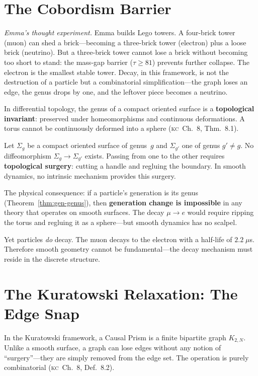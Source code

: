 \documentclass[11pt, a4paper, openany]{book}
\newcommand{\KC}[1]{\textnormal{(\textsc{kc}~#1)}}
\newcounter{thm}[chapter]
\begin{document}
\section{The Cobordism Barrier}\label{sec:cobordism}

\smallskip\noindent
\textit{Emma's thought experiment.}
Emma builds Lego towers. A four-brick tower (muon) can shed a
brick---becoming a three-brick tower (electron) plus a loose brick
(neutrino). But a three-brick tower cannot lose a brick without becoming
too short to stand: the mass-gap barrier ($\tau \geq 81$) prevents
further collapse.  The electron is the smallest stable tower. Decay, in this framework, is not
the destruction of a particle but a combinatorial simplification---the
graph loses an edge, the genus drops by one, and the leftover piece
becomes a neutrino.
\smallskip

\noindent
In differential topology, the genus of a compact oriented surface is a
\textbf{topological invariant}: preserved under homeomorphisms and
continuous deformations. A torus cannot be continuously deformed into a
sphere \KC{Ch.~8, Thm.~8.1}.

\begin{theorem}\label{thm:cobordism}
Let $\Sigma_g$ be a compact oriented surface of genus~$g$ and
$\Sigma_{g'}$ one of genus $g' \neq g$. No diffeomorphism
$\Sigma_g \to \Sigma_{g'}$ exists. Passing from one to the other
requires \textbf{topological surgery}: cutting a handle and regluing
the boundary. In smooth dynamics, no intrinsic mechanism provides this
surgery.
\end{theorem}

\noindent
The physical consequence: if a particle's generation is its genus
(Theorem~\ref{thm:gen-genus}), then \textbf{generation change is
impossible} in any theory that operates on smooth surfaces. The decay
$\mu \to e$ would require ripping the torus and regluing it as a
sphere---but smooth dynamics has no scalpel.

Yet particles \emph{do} decay. The muon decays to the electron with a
half-life of $2.2\;\mu$s. Therefore smooth geometry cannot be
fundamental---the decay mechanism must reside in the discrete structure.

\section{The Kuratowski Relaxation: The Edge Snap}\label{sec:edge-snap}

In the Kuratowski framework, a Causal Prism is a finite bipartite graph
$K_{2,N}$. Unlike a smooth surface, a graph can lose edges without any
notion of ``surgery''---they are simply removed from the edge set. The
operation is purely combinatorial \KC{Ch.~8, Def.~8.2}.
\end{document}
